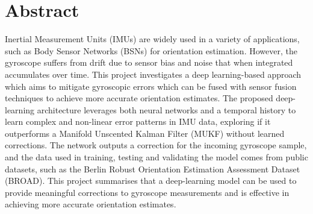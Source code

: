 \section*{Abstract}
Inertial Measurement Units (IMUs) are widely used in a
variety of applications, such as Body Sensor Networks (BSNs) for orientation
estimation. However, the gyroscope suffers from drift due to sensor bias and noise that 
when integrated accumulates over time. This project investigates a deep 
learning-based approach which aims to mitigate gyroscopic errors which can be 
fused with sensor fusion techniques to achieve more accurate orientation 
estimates. The proposed deep-learning architecture leverages both neural 
networks and a temporal history to learn complex and non-linear error patterns
in IMU data, exploring if it outperforms a Manifold Unscented Kalman Filter (MUKF) without learned 
corrections. The network outputs a correction for the incoming gyroscope sample, and
the data used in training, testing and validating the model 
comes from public datasets, 
such as the Berlin Robust Orientation Estimation Assessment Dataset (BROAD). 
This project summarises that a deep-learning model can be used to provide meaningful
corrections to gyroscope measurements and is effective in achieving more 
accurate orientation estimates.